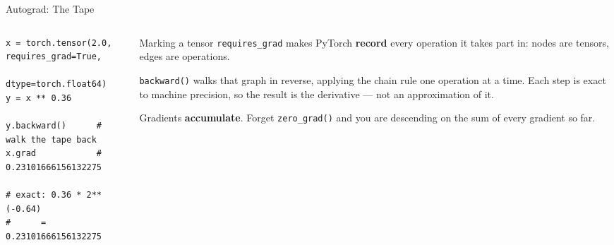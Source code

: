 \begin{frame}[fragile]{Autograd: The Tape}
\begin{columns}[T]
\begin{column}{0.49\textwidth}
\begin{lstlisting}
x = torch.tensor(2.0, requires_grad=True,
                 dtype=torch.float64)
y = x ** 0.36

y.backward()      # walk the tape back
x.grad            # 0.23101666156132275

# exact: 0.36 * 2**(-0.64)
#      = 0.23101666156132275
\end{lstlisting}
\end{column}
\begin{column}{0.48\textwidth}
\small
Marking a tensor \texttt{requires\_grad} makes PyTorch \textbf{record} every operation it takes part in: nodes are tensors, edges are operations.
\medskip

\texttt{backward()} walks that graph in reverse, applying the chain rule one operation at a time. Each step is exact to machine precision, so the result is the derivative --- not an approximation of it.
\medskip
\begin{cautionbox}\footnotesize
Gradients \textbf{accumulate}. Forget \texttt{zero\_grad()} and you are descending on the sum of every gradient so far.
\end{cautionbox}
\end{column}
\end{columns}
\vspace{1mm}
\end{frame}


